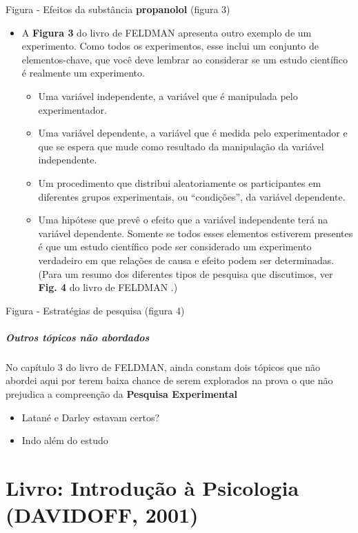 \documentclass[
]{book}
\providecommand{\tightlist}{%
  \setlength{\itemsep}{0pt}\setlength{\parskip}{0pt}}
\begin{document}
Figura - Efeitos da substância \textbf{propanolol} (figura 3)

\begin{itemize}
\tightlist
\item
  A \textbf{Figura 3} do livro de FELDMAN apresenta outro exemplo de um
  experimento. Como todos os experimentos, esse inclui um conjunto de
  elementos-chave, que você deve lembrar ao considerar se um estudo
  científico é realmente um experimento.

  \begin{itemize}
  \tightlist
  \item
    Uma variável independente, a variável que é manipulada pelo
    experimentador.
  \item
    Uma variável dependente, a variável que é medida pelo experimentador
    e que se espera que mude como resultado da manipulação da variável
    independente.
  \item
    Um procedimento que distribui aleatoriamente os participantes em
    diferentes grupos experimentais, ou ``condições'', da variável
    dependente.
  \item
    Uma hipótese que prevê o efeito que a variável independente terá na
    variável dependente. Somente se todos esses elementos estiverem
    presentes é que um estudo científico pode ser considerado um
    experimento verdadeiro em que relações de causa e efeito podem ser
    determinadas. (Para um resumo dos diferentes tipos de pesquisa que
    discutimos, ver \textbf{Fig. 4} do livro de FELDMAN .)
  \end{itemize}
\end{itemize}

Figura - Estratégias de pesquisa (figura 4)

\hypertarget{outros-tuxf3picos-nuxe3o-abordados}{%
\subparagraph{Outros tópicos não
abordados}\label{outros-tuxf3picos-nuxe3o-abordados}}

No capítulo 3 do livro de FELDMAN, ainda constam dois tópicos que não
abordei aqui por terem baixa chance de serem explorados na prova o que
não prejudica a compreenção da \textbf{Pesquisa Experimental}

\begin{itemize}
\tightlist
\item
  Latané e Darley estavam certos?
\item
  Indo além do estudo
\end{itemize}

\hypertarget{livro-introduuxe7uxe3o-uxe0-psicologia-davidoff-2001}{%
\section{\texorpdfstring{Livro: \textbf{Introdução à Psicologia}
(DAVIDOFF,
2001)}{Livro: Introdução à Psicologia (DAVIDOFF, 2001)}}\label{livro-introduuxe7uxe3o-uxe0-psicologia-davidoff-2001}}
\end{document}
